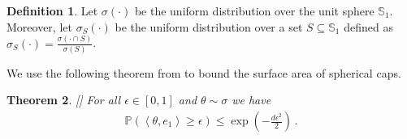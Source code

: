 \documentclass[letter, 12pt]{report}
\newcommand{\ip}[1]{\left \langle #1 \right \rangle}
\newcommand{\paren}[1]{\left( #1 \right)}
\newcommand{\bS}{\mathbb S}
\newcommand{\1}{\mathbf{1}}
\newcommand{\mP}{\mathbb{P}}
\theoremstyle{plain}
\newtheorem{theorem}{Theorem}
\theoremstyle{definition}
\newtheorem{definition}[theorem]{Definition}
\theoremstyle{remark}
\begin{document}
\begin{definition}\label{def:uniform-sphere}
    Let $\sigma(\cdot)$ be the uniform distribution over the unit sphere $\bS_1$.
    Moreover, let $\sigma_{S}(\cdot)$ be the uniform distribution over a set $S \subseteq \bS_1$
    defined as $\sigma_S(\cdot) = \frac{\sigma(\cdot \cap S)}{\sigma(S)}$.
\end{definition}

We use the following theorem from \citep{tkocz2018asymptotic} to bound the surface area of spherical caps.
\begin{theorem}\label{thm:spherical-cap}
    [\citealp[Theorem B.1]{tkocz2018asymptotic}]
    For all $\epsilon \in [0,1]$ and $\theta \sim \sigma$ we have
    \begin{align*}
        \mP\paren{
            \ip{\theta, e_1} \geq \epsilon
        }
        \leq
        \exp\paren{-\frac{d\epsilon^2}{2}}\,.
    \end{align*}
\end{theorem}
\end{document}
